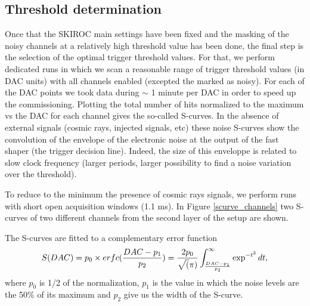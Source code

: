 \documentclass[a4paper,11pt]{article}
\begin{document}
\subsection{Threshold determination}
\label{sec:comm_trigger}

Once that the SKIROC main settings have been fixed and the masking of the noisy channels at a relatively high threshold value
has been done, the final step is the selection of the optimal trigger threshold values.
For that, we perform dedicated runs in which we scan a reasonable range of trigger threshold values (in DAC units)
with all channels enabled (excepted the marked as noisy). For each of the DAC points
we took data during $\sim$ 1 minute per DAC in order to speed up the commissioning.
Plotting the total number of hits normalized to the maximum vs the DAC
for each channel gives the so-called S-curves. In the absence of external signals (cosmic rays, injected signals, etc) 
these noise S-curves show the convolution of the envelope of the 
electronic noise at the output of the fast shaper (the trigger decision line).
Indeed, the size of this enveloppe is related to slow clock frequency
(larger periods, larger possibility to find a noise variation over the threshold).

To reduce to the minimum the
presence of cosmic rays signals, we perform runs with short open acquisition windows (1.1 ms). 
In Figure \ref{scurve_channels} 
two S-curves of two different channels from the second layer of the setup are shown.

The S-curves are fitted to a complementary error function
\begin{equation}
S(DAC)=p_{0} \times erfc(\frac{DAC-p_{1}}{p_{2}}) = 
\newline
\frac{2p_{0}}{\sqrt(\pi)} \int_{\frac{DAC-p_{1}}{p_{2}}}^{\infty} \exp^{-t^{2}} dt,
\label{eq_S-curve}
\end{equation}
where $p_{0}$ is 1/2 of the normalization, $p_{1}$ is the value in which the noise levels are 
the 50\% of its maximum and $p_{2}$ give us the width of the S-curve. 
\end{document}
